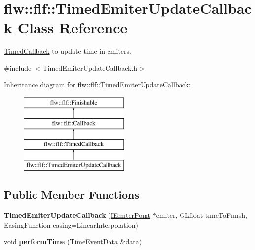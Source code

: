 \hypertarget{classflw_1_1flf_1_1TimedEmiterUpdateCallback}{}\section{flw\+:\+:flf\+:\+:Timed\+Emiter\+Update\+Callback Class Reference}
\label{classflw_1_1flf_1_1TimedEmiterUpdateCallback}


\hyperlink{classflw_1_1flf_1_1TimedCallback}{Timed\+Callback} to update time in emiters.  




{\ttfamily \#include $<$Timed\+Emiter\+Update\+Callback.\+h$>$}

Inheritance diagram for flw\+:\+:flf\+:\+:Timed\+Emiter\+Update\+Callback\+:\begin{figure}[H]
\begin{center}
\leavevmode
\includegraphics[height=4.000000cm]{classflw_1_1flf_1_1TimedEmiterUpdateCallback}
\end{center}
\end{figure}
\subsection*{Public Member Functions}
\begin{DoxyCompactItemize}
\item 
{\bfseries Timed\+Emiter\+Update\+Callback} (\hyperlink{classflw_1_1flf_1_1IEmiterPoint}{I\+Emiter\+Point} $\ast$emiter, G\+Lfloat time\+To\+Finish, Easing\+Function easing=Linear\+Interpolation)\hypertarget{classflw_1_1flf_1_1TimedEmiterUpdateCallback_af319edf4703651fe6898789fbde07ef0}{}\label{classflw_1_1flf_1_1TimedEmiterUpdateCallback_af319edf4703651fe6898789fbde07ef0}

\item 
void {\bfseries perform\+Time} (\hyperlink{structflw_1_1flf_1_1TimeEventData}{Time\+Event\+Data} \&data)\hypertarget{classflw_1_1flf_1_1TimedEmiterUpdateCallback_a503ab0270fcf4df5aa99e5794405224c}{}\label{classflw_1_1flf_1_1TimedEmiterUpdateCallback_a503ab0270fcf4df5aa99e5794405224c}

\end{DoxyCompactItemize}
